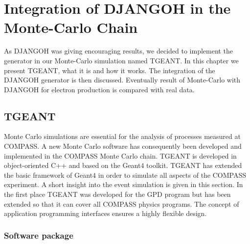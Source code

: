 
\chapter{Integration of DJANGOH in the Monte-Carlo Chain} %

\label{ch:MC} %


As DJANGOH was giving encouraging results, we decided to implement the generator in our Monte-Carlo simulation named TGEANT. In this chapter we present TGEANT, what it is and how it works. The integration of the DJANGOH generator is then discussed. Eventually result of Monte-Carlo with DJANGOH for electron production is compared with real data.

\section{TGEANT}

Monte Carlo simulations are essential for the analysis of processes measured at COMPASS. A new Monte Carlo software has consequently been developed and implemented in the COMPASS Monte Carlo chain. TGEANT \cite{Tobias} is developed in object-oriented C++ and based on the Geant$4$ toolkit. TGEANT has extended the basic framework of Geant$4$ in order to simulate all aspects of the COMPASS experiment. A short insight into the event simulation is given in this section.
In the first place TGEANT was developed for the GPD program but has been extended so that it can cover all COMPASS physics programs. The concept of application programming interfaces ensures a highly flexible design.

\subsection{Software package}

